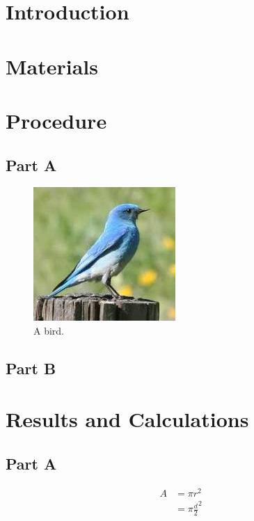\documentclass[12pt]{article}
\begin{document}
 

\LabHeader

\section*{Introduction}
\lipsum[1-2]
\section*{Materials}
\lipsum[3-3]
\section*{Procedure}
\lipsum[4-5]
\subsection*{Part A}
\begin{figure}
	\centering
	\includegraphics[width=0.7\linewidth]{bird.jpg}
	\caption{A bird.}
\end{figure}
\lipsum[10]
\subsection*{Part B}
\lipsum[11]

\section*{Results and Calculations}
\lipsum[6-6]
\subsection*{Part A}

\begin{align*}
	A &= \pi r^2 \\
	  &= \pi \frac{d}{2}^2
\end{align*}
\end{document}
